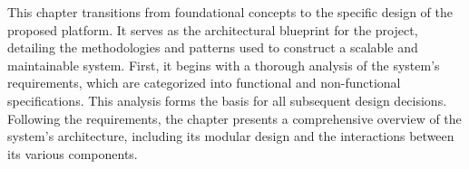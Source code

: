 This chapter transitions from foundational concepts to the specific design of the proposed platform. It serves as the architectural blueprint for the project, detailing the methodologies and patterns used to construct a scalable and maintainable system. First, it begins with a thorough analysis of the system's requirements, which are categorized into functional and non-functional specifications. This analysis forms the basis for all subsequent design decisions. Following the requirements, the chapter presents a comprehensive overview of the system's architecture, including its modular design and the interactions between its various components.